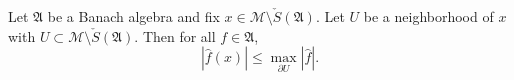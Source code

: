 
Let $\mathfrak{A}$ be a Banach algebra and fix $x \in \mathcal{M} \setminus \check{S}(\mathfrak{A})$. Let $U$ be a neighborhood of $x$ with $U \subset \mathcal{M} \setminus \check{S}(\mathfrak{A})$. Then for all $f \in \mathfrak{A}$,
$$|\hat{f}(x)| \leq \max_{\partial U} |\hat{f}|.$$
